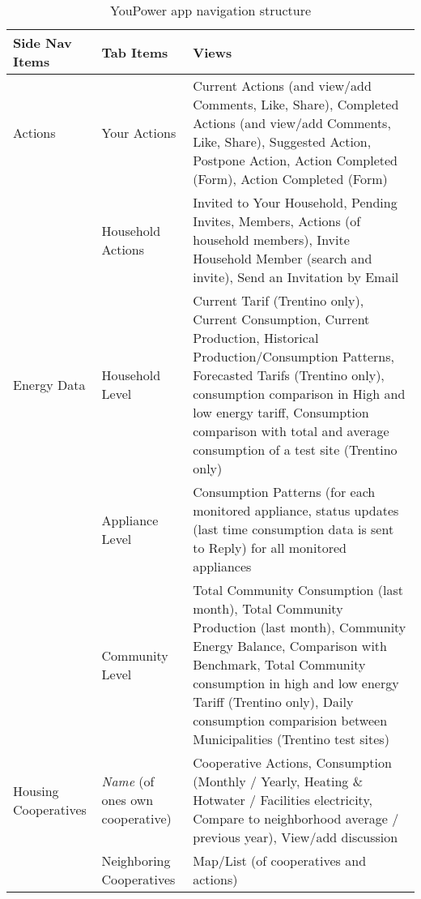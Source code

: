 \begin{longtable}{ p{3.5cm}  p{3.5cm} p{7.5cm}}
\caption{YouPower app navigation structure}\label{tab:app_nav}\\
\hline
\textbf{Side Nav Items}  &
\textbf{Tab Items}  &
\textbf{Views}  \\ \hline

Actions & Your Actions & Current Actions (and view/add Comments, Like, Share), Completed Actions (and view/add Comments, Like, Share), Suggested Action, Postpone Action, Action Completed (Form), Action Completed (Form) \\ \cline{2-3}
& Household Actions & Invited to Your Household, Pending Invites, Members, Actions (of household members), Invite Household Member (search and invite), Send an Invitation by Email \\ 
\hline

Energy Data  & Household Level  & Current Tarif (Trentino only), Current Consumption, Current Production, Historical Production/Consumption Patterns, Forecasted Tarifs (Trentino only), consumption comparison in High and low energy tariff, Consumption comparison with total and average consumption of a test site (Trentino only) \\  \cline{2-3}
& Appliance Level & Consumption Patterns (for each monitored appliance, status updates (last time consumption data is sent to Reply) for all monitored appliances\\  \cline{2-3}
&  Community Level & Total Community Consumption (last month), Total Community Production (last month), Community Energy Balance, Comparison with Benchmark, Total Community consumption in high and low energy Tariff (Trentino only), Daily consumption comparision between Municipalities (Trentino test sites)\\  \hline

Housing Cooperatives & \textit{Name} (of ones own cooperative) & Cooperative Actions, Consumption (Monthly / Yearly, Heating \& Hotwater / Facilities electricity, Compare to neighborhood average / previous year), View/add discussion \\ \cline{2-3}
& Neighboring Cooperatives &  Map/List (of cooperatives and actions) \\  \hline



\end{longtable}
